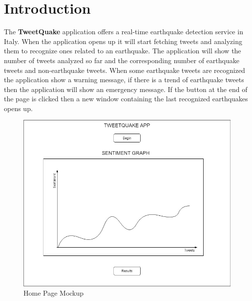 \documentclass[a4paper, oneside]{article}
\begin{document}
\baselineskip 13pt
\hypersetup{
    colorlinks=true,
    linkcolor=blue,
}

\begin{frontespizio} 
\Preambolo{\renewcommand{\frontpretitlefont}{\fontsize{15}{12}\scshape}}
\Rientro {1cm}
 \Punteggiatura {}
\end{frontespizio}


\clearpage


	\tableofcontents\thispagestyle{empty}
	\clearpage


\section{Introduction}
The \textbf{TweetQuake} application offers a real-time earthquake detection service in Italy. When the application opens up it will start fetching tweets and analyzing them to recognize ones related to an earthquake.
The application will show the number of tweets analyzed so far and the corresponding number of earthquake tweets and non-earthquake tweets. When some earthquake tweets are recognized the application show a warning message, if there is a trend of earthquake tweets then the application will show an emergency message. If the button at the end of the page is clicked then a new window containing the last recognized earthquakes opens up.
\vspace{5mm}
\begin{figure}[h]
\centering
\includegraphics[width=\textwidth]{./images/diagrams/HomeMockup} 
\caption{Home Page Mockup}
\label{fig:mockup}
\end{figure}
\end{document}
